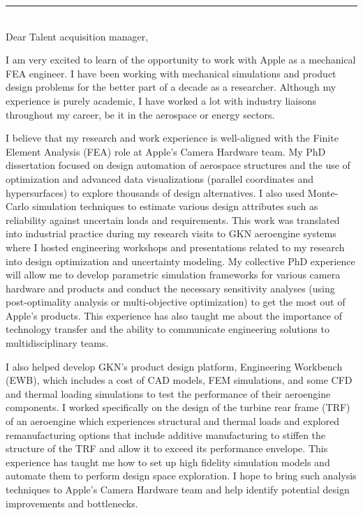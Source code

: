 \documentclass[12pt]{article} %
\begin{document}
\begin{paracol}{2}
\end{paracol}

\medskip %
\rule[0pt]{\textwidth}{1pt}\\

Dear Talent acquisition manager,

\medskip %
I am very excited to learn of the opportunity to work with Apple as a mechanical FEA engineer. I have been working with mechanical simulations and product design problems for the better part of a decade as a researcher. Although my experience is purely academic, I have worked a lot with industry liaisons throughout my career, be it in the aerospace or energy sectors.

\medskip %

I believe that my research and work experience is well-aligned with the Finite Element Analysis (FEA) role at Apple's Camera Hardware team. My PhD dissertation focused on design automation of aerospace structures and the use of optimization and advanced data visualizations (parallel coordinates and hypersurfaces) to explore thousands of design alternatives. I also used Monte-Carlo simulation techniques to estimate various design attributes such as reliability against uncertain loads and requirements. This work was translated into industrial practice during my research visits to GKN aeroengine systems where I hosted engineering workshops and presentations related to my research into design optimization and uncertainty modeling. My collective PhD experience will allow me to develop parametric simulation frameworks for various camera hardware and products and conduct the necessary sensitivity analyses (using post-optimality analysis or multi-objective optimization) to get the most out of Apple's products. This experience has also taught me about the importance of technology transfer and the ability to communicate engineering solutions to multidisciplinary teams.

\medskip %

I also helped develop GKN's product design platform, Engineering Workbench (EWB), which includes a cost of CAD models, FEM simulations, and some CFD and thermal loading simulations to test the performance of their aeroengine components. I worked specifically on the design of the turbine rear frame (TRF) of an aeroengine which experiences structural and thermal loads and explored remanufacturing options that include additive manufacturing to stiffen the structure of the TRF and allow it to exceed its performance envelope.  This experience has taught me how to set up high fidelity simulation models and automate them to perform design space exploration. I hope to bring such analysis techniques to Apple's Camera Hardware team and help identify potential design improvements and bottlenecks.
\end{document}
